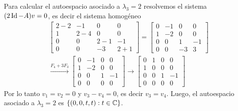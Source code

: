 \begin{enumerate}[resume,topsep=6pt,itemsep=.4cm]
    Para calcular el autoespacio asociado a $\lambda_3=2$ resolvemos el sistema  $(2\operatorname{Id}-A)v=0$, es decir el sistema homogéneo
    \begin{align*}
        &\begin{bmatrix} 2-2 & -1 & 0 & 0\\ 1 & 2-4 & 0 & 0\\ 0 & 0 & 2-1 & -1 \\ 0 & 0 & -3 & 2+1\end{bmatrix} =  \begin{bmatrix} 0 & -1 & 0 & 0\\ 1 & -2 & 0 & 0\\ 0 & 0 & 1 & -1 \\ 0 & 0 & -3 & 3 \end{bmatrix} \\
        & \stackrel{F_4+3F_3}{\longrightarrow} \begin{bmatrix} 0 & -1 & 0 & 0\\ 1 & -2 & 0 & 0\\ 0 & 0 & 1 & -1 \\ 0 & 0 & 0& 0 \end{bmatrix} \longrightarrow \begin{bmatrix} 0 & 1 & 0 & 0\\ 1 & 0 & 0 & 0\\ 0 & 0 & 1 & -1 \\ 0 & 0 & 0 & 0 \end{bmatrix}
    \end{align*}
    Por lo tanto $v_1 = v_2 = 0$ y $v_3 - v_4 =0$, es decir $v_3 = v_4$. Luego, el autoespacio asociado a $\lambda_3=2$ es $\{(0,0,t,t): t \in \mathbb C\}$.


\end{enumerate}
